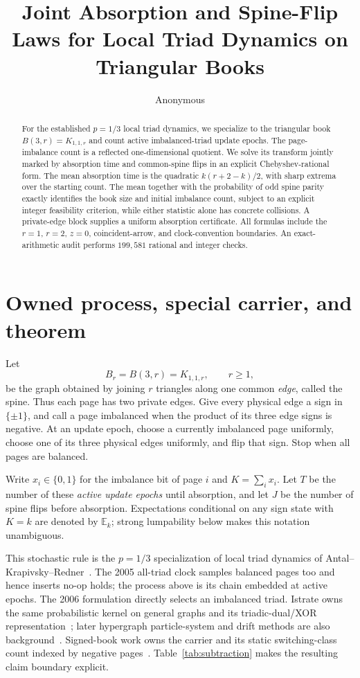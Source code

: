 \documentclass[a4paper,10pt]{amsart}
\title[Triad dynamics on triangular books]{Joint Absorption and Spine-Flip Laws for Local Triad Dynamics on Triangular Books}
\author{Anonymous}
\date{}
\theoremstyle{remark}
\newcommand{\E}{\mathbb E}
\newcommand{\Br}{B_r}
\begin{document}
\begin{abstract}
For the established $p=1/3$ local triad dynamics, we specialize to the
triangular book $B(3,r)=K_{1,1,r}$ and count active imbalanced-triad update
epochs.  The page-imbalance count is a reflected one-dimensional quotient.
We solve its transform jointly marked by absorption time and common-spine
flips in an explicit Chebyshev-rational form.  The mean absorption time is the
quadratic $k(r+2-k)/2$, with sharp extrema over the starting count.  The mean
together with the probability of odd spine parity exactly identifies the
book size and initial imbalance count, subject to an explicit integer
feasibility criterion, while either statistic alone has concrete collisions.
A private-edge block supplies a uniform absorption certificate.  All formulas
include the $r=1$, $r=2$, $z=0$, coincident-arrow, and clock-convention
boundaries.  An exact-arithmetic audit performs $199{,}581$ rational and
integer checks.
\end{abstract}

\maketitle

\section{Owned process, special carrier, and theorem}\label{sec:setup}

Let
\[
 \Br=B(3,r)=K_{1,1,r},\qquad r\geq1,
\]
be the graph obtained by joining $r$ triangles along one common \emph{edge},
called the spine.  Thus each page has two private edges.  Give every physical
edge a sign in $\{\pm1\}$, and call a page imbalanced when the product of its
three edge signs is negative.  At an update epoch, choose a currently
imbalanced page uniformly, choose one of its three physical edges uniformly,
and flip that sign.  Stop when all pages are balanced.

Write $x_i\in\{0,1\}$ for the imbalance bit of page $i$ and
$K=\sum_i x_i$.  Let $T$ be the number of these \emph{active update epochs}
until absorption, and let $J$ be the number of spine flips before absorption.
Expectations conditional on any sign state with $K=k$ are denoted by $\E_k$;
strong lumpability below makes this notation unambiguous.

This stochastic rule is the $p=1/3$ specialization of local triad dynamics
of Antal--Krapivsky--Redner~\cite{AntalKrapivskyRedner2005,AntalKrapivskyRedner2006}.
The 2005 all-triad clock samples balanced pages too and hence inserts no-op
holds; the process above is its chain embedded at active epochs.  The 2006
formulation directly selects an imbalanced triad.  Istrate owns the same
probabilistic kernel on general graphs and its triadic-dual/XOR
representation~\cite{Istrate2009}; later hypergraph particle-system and drift
methods are also background~\cite{IstrateBonchisMarin2019}.  Signed-book work
owns the carrier and its static switching-class count indexed by negative
pages~\cite{SehrawatBhattacharjya2022}.  Table~\ref{tab:subtraction} makes the
resulting claim boundary explicit.
\end{document}
